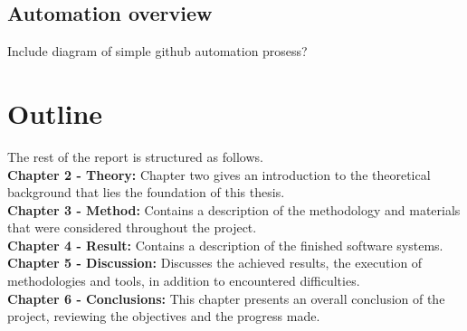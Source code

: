 \subsection{Automation overview}
\colorbox{RubineRed}{Include diagram of simple github automation prosess?}

\section{Outline}

The rest of the report is structured as follows.\\
\break
\textbf{Chapter 2 - Theory:} Chapter two gives an introduction to the theoretical background that lies the foundation of this thesis.\\
\break
\textbf{Chapter 3 - Method:} Contains a description of the methodology and materials that were considered throughout the project.\\
\break
\textbf{Chapter 4 - Result:} Contains a description of the finished software systems.\\
\break
\textbf{Chapter 5 - Discussion:} Discusses the achieved results, the execution of methodologies and tools, in addition to encountered difficulties.\\
\break
\textbf{Chapter 6 - Conclusions:} This chapter presents an overall conclusion of the project, reviewing the objectives and the progress made.\\